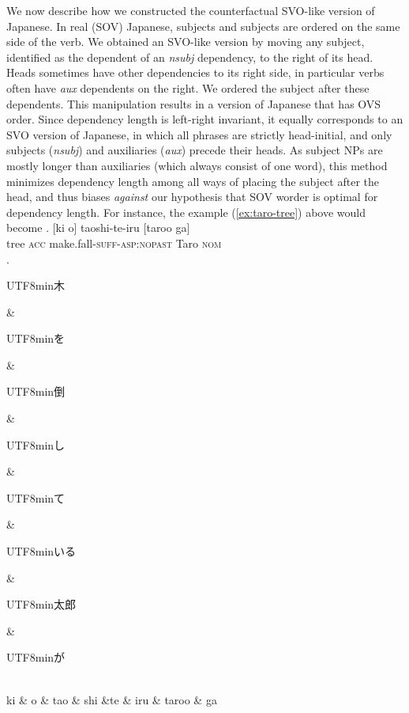 \documentclass[11pt,a4paper]{article}
\newcommand{\japanese}[1]{\begin{CJK}{UTF8}{min}#1\end{CJK}}
\begin{document}
We now describe how we constructed the counterfactual SVO-like version of Japanese.
In real (SOV) Japanese, subjects and subjects are ordered on the same side of the verb.
We obtained an SVO-like version by moving any subject, identified as the dependent of an \textit{nsubj} dependency, to the right of its head.
Heads sometimes have other dependencies to its right side, in particular verbs often have \textit{aux} dependents on the right.
We ordered the subject after these dependents.
This manipulation results in a version of Japanese that has OVS order.
Since dependency length is left-right invariant, it equally corresponds to an SVO version of Japanese, in which all phrases are strictly head-initial, and only subjects (\textit{nsubj}) and auxiliaries (\textit{aux}) precede their heads.
As subject NPs are mostly longer than auxiliaries (which always consist of one word), this method minimizes dependency length among all ways of placing the subject after the head, and thus biases \emph{against} our hypothesis that SOV worder is optimal for dependency length.
For instance, the example (\ref{ex:taro-tree}) above would become
\exg.  [ki o] taoshi-te-iru [taroo ga] \\
 tree \textsc{acc} make.fall-\textsc{suff}-\textsc{asp:nopast} Taro \textsc{nom}\\

\ex.
\begin{dependency}[theme = simple]
   \begin{deptext}[column sep=1em]
          \japanese{木} \& \japanese{を} \& \japanese{倒} \& \japanese{し} \& \japanese{て} \& \japanese{いる} \&  \japanese{太郎} \& \japanese{が}\\
          ki \& o \& tao \& shi \&te \& iru \& taroo \& ga\\ 
   \end{deptext}
\end{dependency}\label{ex:taro-tree-tree-counter}
\end{document}
